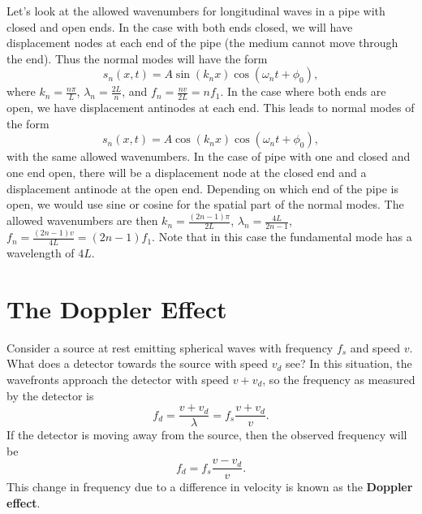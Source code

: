 \documentclass[../classical_mechanics.tex]{subfiles}
\begin{document}
        Let's look at the allowed wavenumbers for longitudinal waves in a pipe with closed and open ends.
        In the case with both ends closed, we will have displacement nodes at each end of the pipe (the medium cannot move through the end).
        Thus the normal modes will have the form
        \begin{equation}
            s_n(x,t)=A\sin(k_n x)\cos(\omega_n t+\phi_0),
        \end{equation}
        where $k_n=\frac{n\pi}{L}$, $\lambda_n=\frac{2L}{n}$, and $f_n=\frac{nv}{2L}=nf_1$.
        In the case where both ends are open, we have displacement antinodes at each end.
        This leads to normal modes of the form
        \begin{equation}
            s_n(x,t)=A\cos(k_n x)\cos(\omega_n t+\phi_0),
        \end{equation}
        with the same allowed wavenumbers.
        In the case of pipe with one and closed and one end open, there will be a displacement node at the closed end and a displacement antinode at the open end.
        Depending on which end of the pipe is open, we would use sine or cosine for the spatial part of the normal modes.
        The allowed wavenumbers are then $k_n=\frac{(2n-1)\pi}{2L}$, $\lambda_n=\frac{4L}{2n-1}$, $f_n=\frac{(2n-1)v}{4L}=(2n-1)f_1$.
        Note that in this case the fundamental mode has a wavelength of $4L$.

    \section{The Doppler Effect}\label{sec:the-doppler-effect}
        Consider a source at rest emitting spherical waves with frequency $f_s$ and speed $v$.
        What does a detector towards the source with speed $v_d$ see?
        In this situation, the wavefronts approach the detector with speed $v+v_d$, so the frequency as measured by the detector is
        \begin{equation}
            f_d=\frac{v+v_d}{\lambda}=f_s\frac{v+v_d}{v}.
        \end{equation}
        If the detector is moving away from the source, then the observed frequency will be
        \begin{equation}
            f_d=f_s\frac{v-v_d}{v}.
        \end{equation}
        This change in frequency due to a difference in velocity is known as the \textbf{Doppler effect}.
\end{document}
